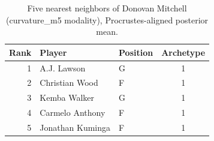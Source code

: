 \begin{table}[htbp]
  \centering\small
  \begin{tabular}{rllc}
    \toprule
    Rank & Player & Position & Archetype \\
    \midrule
    1 & A.J. Lawson & G & 1 \\
    2 & Christian Wood & F & 1 \\
    3 & Kemba Walker & G & 1 \\
    4 & Carmelo Anthony & F & 1 \\
    5 & Jonathan Kuminga & F & 1 \\
    \bottomrule
  \end{tabular}
  \caption{Five nearest neighbors of Donovan Mitchell (curvature_m5 modality), Procrustes-aligned posterior mean.}
  \label{tab:Donovan_Mitchell_neighbors_curvature_m5}
\end{table}

